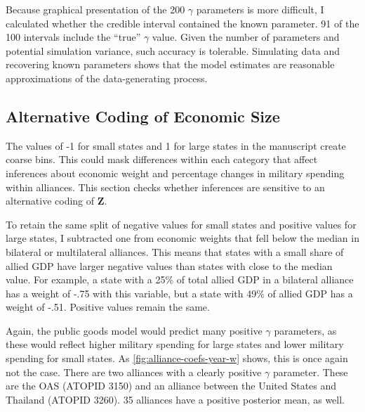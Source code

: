 \documentclass[12pt]{article}
\begin{document}
Because graphical presentation of the 200 $\gamma$ parameters is more difficult, I calculated whether the credible interval contained the known parameter. 
91 of the 100 intervals include the ``true'' $\gamma$ value. 
Given the number of parameters and potential simulation variance, such accuracy is tolerable. 
Simulating data and recovering known parameters shows that the model estimates are reasonable approximations of the data-generating process. 


\subsection{Alternative Coding of Economic Size}


The values of -1 for small states and 1 for large states in the manuscript create coarse bins. 
This could mask differences within each category that affect inferences about economic weight and percentage changes in military spending within alliances. 
This section checks whether inferences are sensitive to an alternative coding of $\textbf{Z}$. 


To retain the same split of negative values for small states and positive values for large states, I subtracted one from economic weights that fell below the median in bilateral or multilateral alliances. 
This means that states with a small share of allied GDP have larger negative values than states with close to the median value. 
For example, a state with a 25\% of total allied GDP  in a bilateral alliance has a weight of -.75 with this variable, but a state with 49\% of allied GDP has a weight of -.51. 
Positive values remain the same.


Again, the public goods model would predict many positive $\gamma$ parameters, as these would reflect higher military spending for large states and lower military spending for small states. 
As \autoref{fig:alliance-coefs-year-w} shows, this is once again not the case. 
There are two alliances with a clearly positive $\gamma$ parameter. 
These are the OAS (ATOPID 3150) and an alliance between the United States and Thailand (ATOPID 3260). 
35 alliances have a positive posterior mean, as well. 
\end{document}
